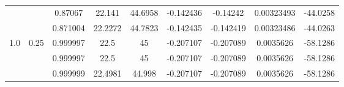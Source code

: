 \documentclass[11pt]{article}
\begin{document}
\begin{tabular}{|c|c|c|c|c|c|c|c|c|}
 &  & 0.87067 & 22.141 & 44.6958 & -0.142436 & -0.14242 & 0.00323493 & -44.0258\\\cline{3-9}
 &  & 0.871004 & 22.2272 & 44.7823 & -0.142435 & -0.142419 & 0.00323486 & -44.0263\\\hline
\multirow{3}{*}{1.0} & \multirow{3}{*}{0.25} & 0.999997 & 22.5 & 45 & -0.207107 & -0.207089 & 0.0035626 & -58.1286\\\cline{3-9}
 &  & 0.999997 & 22.5 & 45 & -0.207107 & -0.207089 & 0.0035626 & -58.1286\\\cline{3-9}
 &  & 0.999999 & 22.4981 & 44.998 & -0.207107 & -0.207089 & 0.0035626 & -58.1286\\\hline
 \end{tabular}
\end{document}
